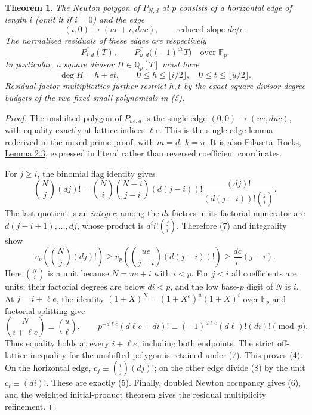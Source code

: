 \documentclass[11pt]{article}
\newtheorem{theorem}{Theorem}
\newcommand{\Q}{\mathbb Q}
\newcommand{\F}{\mathbb F}
\newcommand{\vp}{v_p}
\begin{document}
\begin{theorem}\label{thm:shift}
The Newton polygon of $P_{N,d}$ at $p$ consists of a horizontal edge
of length $i$ (omit it if $i=0$) and the edge
\[
 (i,0)\longrightarrow(ue+i,duc),\qquad\text{reduced slope }dc/e. \tag{4}
\]
The normalized residuals of these edges are respectively
\[
 \overline{P_{i,d}}(T),\qquad
 \overline{P_{u,d}}\big((-1)^{dc}T\big)\quad\text{over }\F_p. \tag{5}
\]
In particular, a square divisor $H\in\Q_p[T]$ must have
\[
 \deg H=h+e t,\qquad
 0\le h\le\lfloor i/2\rfloor,\quad
 0\le t\le\lfloor u/2\rfloor. \tag{6}
\]
Residual factor multiplicities further restrict $h,t$ by the exact
square-divisor degree budgets of the two fixed small polynomials in (5).
\end{theorem}
\begin{proof}
The unshifted polygon of $P_{ue,d}$ is the single edge
$(0,0)\to(ue,duc)$, with equality exactly at lattice indices $\ell e$.
This is the single-edge lemma rederived in the
\href{MIXED_PRIME_RESIDUAL_WINDOWS.tex}{mixed-prime proof}, with
$m=d$, $k=u$. It is also
\href{https://www.impan.pl/shop/publication/transaction/download/product/91656}
{Filaseta--Rocks, Lemma 2.3}, expressed in literal rather than reversed
coefficient coordinates.

For $j\ge i$, the binomial flag identity gives
\[
 \binom Nj(dj)!
 =\binom Ni\binom{N-i}{j-i}(d(j-i))!
 \frac{(dj)!}{(d(j-i))!\binom ji}. \tag{7}
\]
The last quotient is an \emph{integer}: among the $di$ factors in its
factorial numerator are $d(j-i+1),\ldots,dj$, whose product is
$d^i i!\binom ji$. Therefore (7) and integrality show
\[
 \vp\!\left(\binom Nj(dj)!\right)
 \ge \vp\!\left(\binom{ue}{j-i}(d(j-i))!\right)
 \ge\frac{dc}{e}(j-i).
\]
Here $\binom Ni$ is a unit because $N=ue+i$ with $i<p$.
For $j<i$ all coefficients are units: their factorial degrees are
below $di<p$, and the low base-$p$ digit of $N$ is $i$.
At $j=i+\ell e$, the identity
$(1+X)^N=(1+X^e)^u(1+X)^i$ over $\F_p$ and factorial splitting give
\[
 \binom N{i+\ell e}\equiv\binom u\ell,\qquad
 p^{-d\ell c}(d\ell e+di)!
 \equiv(-1)^{d\ell c}(d\ell)!(di)!\pmod p. \tag{8}
\]
Thus equality holds at every $i+\ell e$, including both endpoints.
The strict off-lattice inequality for the unshifted polygon is retained
under (7). This proves (4). On the horizontal edge,
$c_j\equiv\binom ij(dj)!$; on the other edge divide (8) by the unit
$c_i\equiv(di)!$. These are exactly (5). Finally, doubled Newton
occupancy gives (6), and the weighted initial-product theorem gives
the residual multiplicity refinement.
\end{proof}
\end{document}
